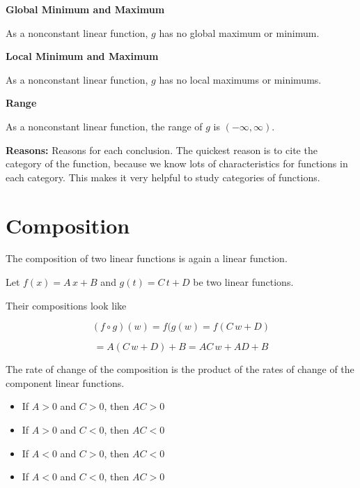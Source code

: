 \documentclass{ximera}
\begin{document}
\begin{example}
\textbf{Global Minimum and Maximum} 

As a nonconstant linear function, $g$ has no global maximum or minimum. 



\textbf{Local Minimum and Maximum} 

As a nonconstant linear function, $g$ has no local maximums or minimums. 



\textbf{Range} 

As a nonconstant linear function, the range of $g$ is $(-\infty, \infty)$. 



\end{example}

\textbf{Reasons:} Reasons for each conclusion.  The quickest reason is to cite the category of the function, because we know lots of characteristics for functions in each category.  This makes it very helpful to study categories of functions. 













\section*{Composition}



The composition of two linear functions is again a linear function.


Let $f(x) = A \, x + B$ and $g(t) = C \, t + D$ be two linear functions.


Their compositions look like

\[  (f \circ g)(w) = f(g(w) = f(C \, w + D) \]

\[  = A (C \, w + D) + B = A C \, w + A D + B   \]

The rate of change of the composition is the product of the rates of change of the component linear functions.

\begin{itemize}
\item If $A > 0$ and $C > 0$, then $A C > 0$
\item If $A > 0$ and $C < 0$, then $A C < 0$
\item If $A < 0$ and $C > 0$, then $A C < 0$
\item If $A < 0$ and $C < 0$, then $A C > 0$
\end{itemize}
\end{document}
